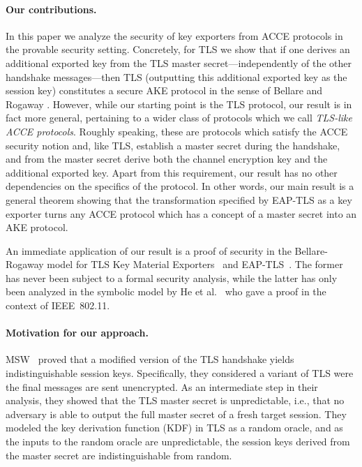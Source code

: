 \paragraph{Our contributions.}
In this paper we analyze the security of key exporters from ACCE protocols in the provable security setting.  Concretely,
for TLS we show that if one derives an additional exported key from the TLS master secret---independently 
of the other handshake messages---then TLS (outputting this additional exported key as the session key) constitutes a secure AKE protocol in the sense of Bellare and Rogaway \cite{C:BelRog93}.  
However, while our starting point is the TLS protocol, 
our result is in fact more general, 
pertaining to a wider class of protocols which we call \emph{TLS-like ACCE protocols}.  
Roughly speaking, 
these are protocols which satisfy the ACCE security notion and, 
like TLS, establish a master secret during the handshake, 
and from the master secret derive both the channel encryption key and the additional exported key.  
Apart from this requirement, our result has no other dependencies on the specifics of the protocol.
In other words, our main result is a general theorem showing that the transformation specified by EAP-TLS as a key exporter turns any ACCE protocol which has a concept of a master secret into an AKE protocol.

An immediate application of our result is a proof of security in the Bellare-Rogaway model for TLS Key Material Exporters~\cite{IETF:RFC:5705:TLS-key-exporters} and EAP-TLS~\cite{IETF:2008:RFC5216-EAP-TLS}.
The former has never been subject to a formal security analysis,
while the latter has only been analyzed  in the symbolic model by He et al.~\cite{CCS:HSDDM05}
who gave a proof in the context of IEEE~802.11.




\paragraph{Motivation for our approach.}
MSW~\cite{JC:MorSmaWar10} proved that a modified version of the TLS handshake yields indistinguishable session keys.
Specifically,
they considered a variant of TLS were the final messages are sent unencrypted.
As an intermediate step in their analysis, they showed that the TLS master secret is unpredictable,
i.e., that no adversary is able to output the full master secret of a fresh target session.
They modeled the key derivation function (KDF) in TLS as a random oracle, 
and as the inputs to the random oracle are unpredictable, 
the session keys derived from the master secret are indistinguishable from random.

